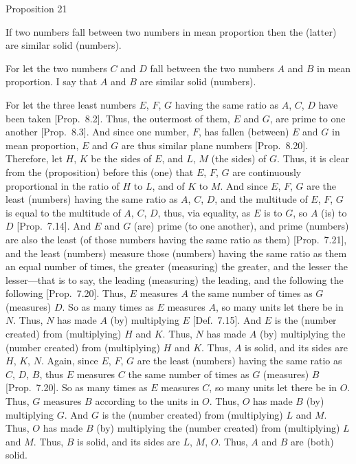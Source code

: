 
\begin{center}
{\large Proposition 21}
\end{center}

If two numbers fall between two numbers
in mean proportion  then the (latter) are similar solid (numbers).

For let the two numbers $C$ and $D$ fall between the two numbers
$A$ and $B$ in mean proportion. I say that $A$ and $B$ are similar
solid (numbers).

For let the three least numbers $E$, $F$, $G$  having the
same ratio as $A$, $C$, $D$ have been taken [Prop.~8.2]. Thus,
the outermost of them, $E$ and $G$, are prime to one another
[Prop.~8.3]. And since one number, $F$, has
fallen (between) $E$ and $G$ in mean proportion, $E$ and $G$ are thus
similar plane numbers [Prop.~8.20].
Therefore, let $H$, $K$ be the sides of $E$, and $L$, $M$ (the sides) of $G$. Thus, it is clear from the (proposition) before this (one)
that $E$, $F$, $G$ are continuously proportional in the ratio of $H$ to $L$,
and of $K$ to $M$. And since $E$, $F$, $G$ are the least (numbers)
having the same ratio as $A$, $C$, $D$, and the multitude of $E$, $F$, $G$
is equal to the multitude of $A$, $C$, $D$, thus, via equality, as $E$ is to
$G$, so $A$ (is) to $D$ [Prop.~7.14]. And
$E$ and $G$ (are) prime (to one another), and prime (numbers) are also the least (of
those numbers having the same ratio as them) [Prop.~7.21],
and the least (numbers) measure those (numbers) having the same ratio
as them an equal number of times, the greater (measuring) the greater, and
the lesser the lesser---that is to say, the leading (measuring) the leading, and
the following the following [Prop.~7.20]. Thus,
$E$ measures $A$ the same number of times as $G$ (measures) $D$. 
So as many times as $E$ measures $A$, so many units let there be in $N$.
Thus, $N$ has made $A$ (by) multiplying $E$ [Def.~7.15]. And $E$ is the (number created) from (multiplying) $H$ and $K$. Thus, $N$ has made $A$ (by) multiplying
the (number created) from (multiplying) $H$ and $K$. Thus, $A$ is  solid, and its sides are $H$, $K$, $N$. Again, since $E$, $F$, $G$
are the least (numbers) having the same ratio as $C$, $D$, $B$, thus $E$
measures $C$ the same number of times as $G$ (measures) $B$ [Prop.~7.20]. So as many times as $E$ measures $C$, so many units let there be in $O$. Thus, $G$ measures $B$ according to
the units in $O$. Thus, $O$ has made $B$ (by) multiplying $G$. And
$G$ is the (number created) from (multiplying) $L$ and $M$. Thus, $O$ has made $B$ (by) multiplying the (number created) from (multiplying)
$L$ and $M$. Thus, $B$ is  solid, and its sides are $L$, $M$, $O$.
Thus,  $A$ and $B$ are (both) solid.

